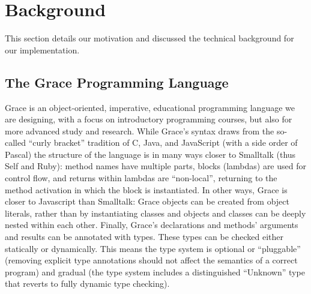 
\section{Background}
\label{sec:background}

This section details our motivation and
discussed the technical background for our implementation.


%
%

\subsection{The Grace Programming Language}

Grace is an object-oriented, imperative, educational programming
language we are designing, with a focus on introductory programming
courses, but also for more advanced study
and research\citep{graceAbsence,seekinGraceSIGCSE}.
While Grace's syntax draws
from the so-called ``curly bracket'' tradition of C, Java, and
JavaScript (with a side order of Pascal) the structure of the language
is in many ways closer to Smalltalk (thus Self and Ruby): method names
have multiple parts, blocks (lambdas) are used for control flow, and
returns within lambdas are ``non-local'', returning to the method
activation in which the block is instantiated\citep{bluebook}.  In
other ways, Grace is closer to Javascript than Smalltalk: Grace
objects can be created from object literals, rather than by
instantiating classes\citep{Black2007-emeraldHOPL,JonesECOOP2016} and
objects and classes can be deeply nested within each 
other\citep{betabook}.  Finally, Grace's declarations and methods' arguments
and results can be annotated with types.  These types can be checked
either statically or dynamically. This means the type system is
optional or ``pluggable'' \citep{GiladPliggable2004} (removing explicit
type annotations should not affect the semantics of a correct program\citep{gradualGuaratee}) and gradual (the type system includes a
distinguished ``Unknown'' type that reverts to fully
dynamic type checking).


